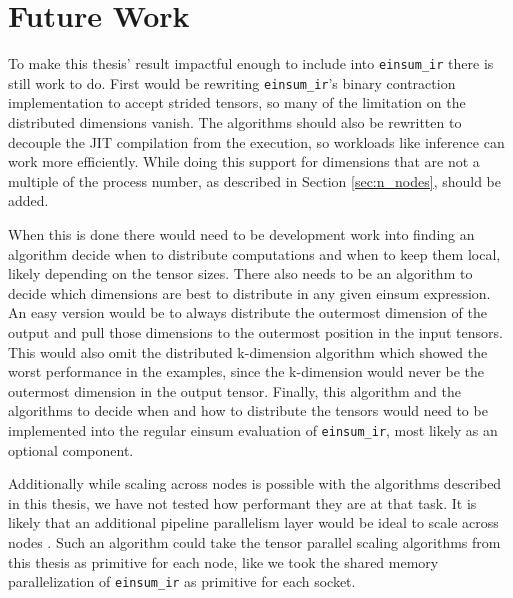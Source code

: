 \section{Future Work}

To make this thesis' result impactful enough to include into \texttt{einsum\_ir} there is still work to do.
First would be rewriting \texttt{einsum\_ir}'s binary contraction implementation to accept strided tensors, so many of the limitation on the distributed dimensions vanish.
The algorithms should also be rewritten to decouple the JIT compilation from the execution, so workloads like inference can work more efficiently.
While doing this support for dimensions that are not a multiple of the process number, as described in Section \ref{sec:n_nodes}, should be added.

When this is done there would need to be development work into finding an algorithm decide when to distribute computations and when to keep them local, likely depending on the tensor sizes.
There also needs to be an algorithm to decide which dimensions are best to distribute in any given einsum expression.
An easy version would be to always distribute the outermost dimension of the output and pull those dimensions to the outermost position in the input tensors.
This would also omit the distributed k-dimension algorithm which showed the worst performance in the examples, since the k-dimension would never be the outermost dimension in the output tensor.
Finally, this algorithm and the algorithms to decide when and how to distribute the tensors would need to be implemented into the regular einsum evaluation of \texttt{einsum\_ir}, most likely as an optional component.

Additionally while scaling across nodes is possible with the algorithms described in this thesis, we have not tested how performant they are at that task.
It is likely that an additional pipeline parallelism layer would be ideal to scale across nodes \cite{megatronLM}.
Such an algorithm could take the tensor parallel scaling algorithms from this thesis as primitive for each node, like we took the shared memory parallelization of \texttt{einsum\_ir} as primitive for each socket.